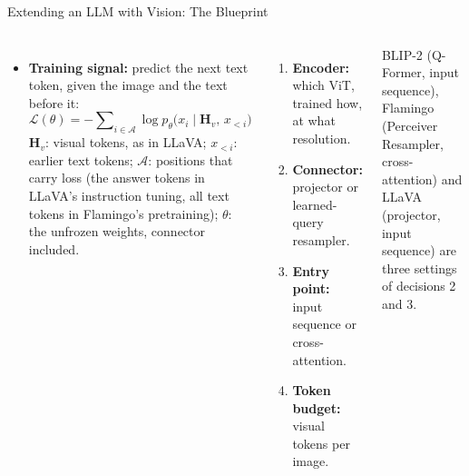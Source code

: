 \begin{frame}{Extending an LLM with Vision: The Blueprint}
  \endgroup
  \vspace{0.2em}
  \begin{columns}[T,onlytextwidth]
      \begin{itemize}\scriptsize\itemsep0.3em
        \item \textbf{Training signal:} predict the next text token, given the image and the text before it:
        \[ \mathcal{L}(\theta) = -\sum\nolimits_{i \in \mathcal{A}} \log p_{\theta}\big(x_i \mid \mathbf{H}_v,\, x_{<i}\big) \]
        $\mathbf{H}_v$: visual tokens, as in LLaVA; $x_{<i}$: earlier text tokens; $\mathcal{A}$: positions that carry loss (the answer tokens in LLaVA's instruction tuning, all text tokens in Flamingo's pretraining); $\theta$: the unfrozen weights, connector included.
      \end{itemize}
      \begin{enumerate}\scriptsize\itemsep0.15em
        \item \textbf{Encoder:} which ViT, trained how, at what resolution.
        \item \textbf{Connector:} projector or learned-query resampler.
        \item \textbf{Entry point:} input sequence or cross-attention.
        \item \textbf{Token budget:} visual tokens per image.
      \end{enumerate}
      \vspace{0.2em}
      {\scriptsize BLIP-2 (Q-Former, input sequence), Flamingo (Perceiver Resampler, cross-attention) and LLaVA (projector, input sequence) are three settings of decisions 2 and 3.\par}
  \end{columns}
\end{frame}

